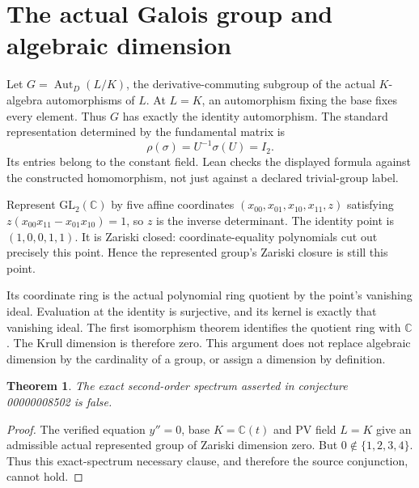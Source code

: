 \documentclass[10pt,a4paper]{article}
\newtheorem{theorem}{Theorem}
\begin{document}
\section{The actual Galois group and algebraic dimension}
Let $G=\operatorname{Aut}_D(L/K)$, the derivative-commuting subgroup of
the actual $K$-algebra automorphisms of $L$. At $L=K$, an automorphism fixing
the base fixes every element. Thus $G$ has exactly the identity automorphism.
The standard representation determined by the fundamental matrix is
\[
\rho(\sigma)=U^{-1}\sigma(U)=I_2.
\]
Its entries belong to the constant field. Lean checks the displayed formula
against the constructed homomorphism, not just against a declared trivial-group
label.

Represent $\mathrm{GL}_2(\mathbb C)$ by five affine coordinates
$(x_{00},x_{01},x_{10},x_{11},z)$ satisfying
$z(x_{00}x_{11}-x_{01}x_{10})=1$, so $z$ is the inverse determinant.
The identity point is $(1,0,0,1,1)$. It is Zariski closed: coordinate-equality
polynomials cut out precisely this point. Hence the represented group's
Zariski closure is still this point.

Its coordinate ring is the actual polynomial ring quotient by the point's
vanishing ideal. Evaluation at the identity is surjective, and its kernel
is exactly that vanishing ideal. The first isomorphism theorem identifies
the quotient ring with $\mathbb C$. The Krull dimension is therefore zero.
This argument does not replace algebraic dimension by the cardinality of a
group, or assign a dimension by definition.

\begin{theorem}
The exact second-order spectrum asserted in conjecture 00000008502 is false.
\end{theorem}
\begin{proof}
The verified equation $y''=0$, base $K=\mathbb C(t)$ and PV field $L=K$
give an admissible actual represented group of Zariski dimension zero.
But $0\notin\{1,2,3,4\}$. Thus this exact-spectrum necessary clause, and
therefore the source conjunction, cannot hold.
\end{proof}
\end{document}

